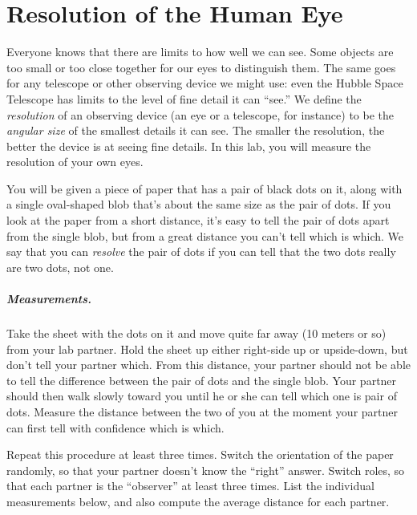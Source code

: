 \chapter{Resolution of the Human Eye}

Everyone knows that there are limits to how well we can see. Some
objects are too small or too close together for our eyes to distinguish
them. The same goes for any telescope or other observing device we
might use: even the Hubble Space Telescope has limits to the level of fine
detail it can ``see.''
We define the \textit{resolution} of an observing device (an eye
or a  telescope,
for instance) to be the \textit{angular size} of
the smallest details it can see. The smaller the resolution, the
better the device is at seeing fine details.
In this lab, you will measure the resolution of your own eyes.

You will be given a piece of paper that has a pair of black dots on it,
along with a single oval-shaped blob that's about the same size as the
pair of dots. If you look at the paper from a short distance, it's
easy to tell the pair of dots apart from the single blob, but from
a great distance you can't tell which is which.
We say that you can \textit{resolve} the pair of dots if you
can tell that the two dots really are two dots, not one.

\paragraph{Measurements.}
Take the sheet with the dots on it and move quite far away (10 meters
or so) from your lab partner. Hold the sheet up either right-side up
or upside-down, but don't tell your partner which. From this
distance, your partner should not be able to tell the difference
between the pair of dots and the single blob.
Your partner
should then walk slowly toward you until he or she can tell which 
one is pair of dots. Measure the distance between the two of you
at the moment your partner can first tell with confidence
which is which.

Repeat this procedure at least three times. Switch the orientation
of the paper randomly, so that your partner doesn't know the ``right''
answer. Switch roles, so that each partner is the ``observer'' 
at least three times.
List the individual measurements below, and
also compute the average distance for each partner.

\vfil\eject


